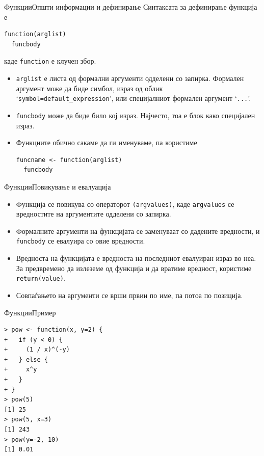 \documentclass[hyperref={unicode}, xcolor={svgnames, table},
usepdftitle=false]{beamer}
\theoremstyle{remark}
\begin{document}
\begin{frame}[fragile]{Функции}{Општи информации и дефинирање}
  Синтаксата за дефинирање функција е
\begin{verbatim}
function(arglist)
  funcbody
\end{verbatim}
каде \texttt{function} е клучен збор.
\begin{itemize}
\item \texttt{arglist} е листа од формални аргументи одделени со запирка.
  Формален аргумент може да биде симбол, израз од облик
  `\texttt{symbol=default_expression}', или специјалниот формален
  аргумент `\texttt{...}'.
\item \texttt{funcbody} може да биде било кој израз.  Најчесто, тоа е
  блок како специјален израз.
\item Функциите обично сакаме да ги именуваме, па користиме
\begin{verbatim}
funcname <- function(arglist)
  funcbody
\end{verbatim}
\end{itemize}
\end{frame}

\begin{frame}[fragile]{Функции}{Повикување и евалуација}
  \begin{itemize}
  \item Функција се повикува со операторот \texttt{(argvalues)}, каде
    \texttt{argvalues} се вредностите на аргументите одделени со запирка.
  \item Формалните аргументи на функцијата се заменуваат со дадените вредности,
    и \texttt{funcbody} се евалуира со овие вредности.
  \item Вредноста на функцијата е вредноста на последниот евалуиран израз во
    неа.  За предвремено да излеземе од функција и да вратиме вредност,
    користиме \texttt{return(value)}.
  \item Совпаѓањето на аргументи се врши првин по име, па потоа по позиција.
  \end{itemize}
\end{frame}

\begin{frame}[fragile]{Функции}{Пример}
\begin{verbatim}
> pow <- function(x, y=2) {
+   if (y < 0) {
+     (1 / x)^(-y)
+   } else {
+     x^y
+   }
+ }
> pow(5)
[1] 25
> pow(5, x=3)
[1] 243
> pow(y=-2, 10)
[1] 0.01
\end{verbatim}
\end{frame}
\end{document}
